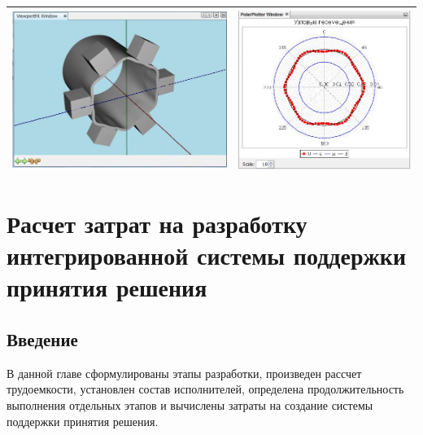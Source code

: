 \documentclass[14pt,oneside,final]{extreport}
\begin{document}
\begin{table}[]
{{\begin{tabu}[]{|c|c|}
						\includegraphics[scale=0.55]{img/simulation-jaw-test-model2} & \includegraphics[scale=0.55]{img/simulation-jaw-test-graph2}  \\ 
						\hline
					\end{tabu}
				}
			}\end{table}


	\chapter{Расчет затрат на разработку интегрированной системы поддержки принятия решения}
	\section{Введение}
	В данной главе сформулированы этапы разработки, произведен рассчет трудоемкости, установлен состав исполнителей, определена продолжительность выполнения отдельных этапов и вычислены затраты на создание системы поддержки принятия решения.	
	
\end{document}
